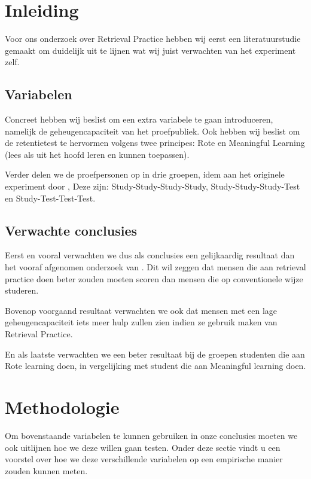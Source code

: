 \documentclass{hogent-article}
\date{\today}
\begin{document}
    \flushbottom
    \maketitle
    \tableofcontents
    \thispagestyle{empty}

    \newpage
    \section{Inleiding}
    
    Voor ons onderzoek over Retrieval Practice hebben wij eerst een literatuurstudie gemaakt om duidelijk uit te lijnen wat wij juist verwachten van het experiment zelf.
    \subsection{Variabelen}
    Concreet hebben wij beslist om een extra variabele te gaan introduceren, namelijk de geheugencapaciteit van het proefpubliek. Ook hebben wij beslist om de retentietest te hervormen volgens twee principes: Rote en Meaningful Learning (lees als uit het hoofd leren en kunnen toepassen).\\
    \par
	\noindent    
    Verder delen we de proefpersonen op in drie groepen, idem aan het originele experiment door \cite{HenryRoediger2006}, Deze zijn: Study-Study-Study-Study, Study-Study-Study-Test  en Study-Test-Test-Test. 
    \subsection{Verwachte conclusies}
    \noindent
    Eerst en vooral verwachten we dus als conclusies een gelijkaardig resultaat dan het vooraf afgenomen onderzoek van \cite{HenryRoediger2006}. Dit wil zeggen dat mensen die aan retrieval practice doen beter zouden moeten scoren dan mensen die op conventionele wijze studeren.\\
    \par
    \noindent
    Bovenop voorgaand resultaat verwachten we ook dat mensen met een lage geheugencapaciteit iets meer hulp zullen zien indien ze gebruik maken van Retrieval Practice.\\
    \par
    \noindent
    En als laatste verwachten we een beter resultaat bij de groepen studenten die aan Rote learning doen, in vergelijking met student die aan Meaningful learning doen.
    
    \section{Methodologie}
    \label{methodology}
    Om bovenstaande variabelen te kunnen gebruiken in onze conclusies moeten we ook uitlijnen hoe we deze willen gaan testen. Onder deze sectie vindt u een voorstel over hoe we deze verschillende variabelen op een empirische manier zouden kunnen meten.
    
\end{document}
